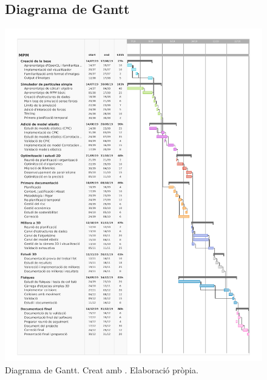 \documentclass[a4paper]{report}
\begin{document}
	\newpage

	\begin{figure}[H]
	\subsection{Diagrama de Gantt}
		\includegraphics[width=1.45\textwidth,center]{images/Gantt.pdf}%
		\caption[Diagrama de Gantt]{Diagrama de Gantt. Creat amb \cite{Teamgantt2019}. Elaboració pròpia.}
		\label{fig:Gantt}
	\end{figure}
\end{document}
